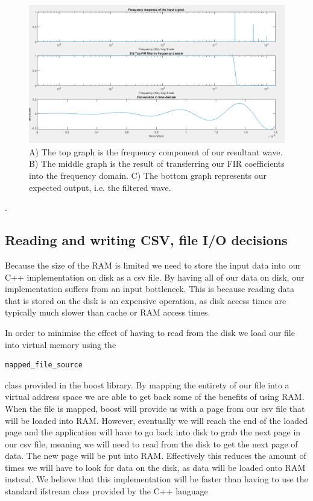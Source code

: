 \documentclass{article}
\begin{document}
\begin{figure}[!htb]
	\includegraphics[width=\linewidth]{matlab2.png}
	\caption{A) The top graph is the frequency component of our resultant wave. B) The middle graph is the result of transferring our FIR coefficients into the frequency domain. C) The bottom graph represents our expected output, i.e. the filtered wave.}
	\label{fig:mat2}
\end{figure}

.

\subsection{Reading and writing CSV, file I/O decisions}

Because the size of the RAM is limited we need to store the input data into our C++ implementation on disk as a csv file. By having all of our data on disk, our implementation suffers from an input bottleneck. This is because reading data that is stored on the disk is an expensive operation, as disk access times are typically much slower than cache or RAM access times. 

In order to minimise the effect of having to read from the disk we load our file into virtual memory using the \begin{verbatim}mapped_file_source\end{verbatim} class provided in the boost library. By mapping the entirety of our file into a virtual address space we are able to get back some of the benefits of using RAM. When the file is mapped, boost will provide us with a page from our csv file that will be loaded into RAM. However, eventually we will reach the end of the loaded page and the application will have to go back into disk to grab the next page in our csv file, meaning we will need to read from the disk to get the next page of data. The new page will be put into RAM. Effectively this reduces the amount of times we will have to look for data on the disk, as data will be loaded onto RAM instead. We believe that this implementation will be faster than having to use the standard ifstream class provided by the C++ language
\end{document}
